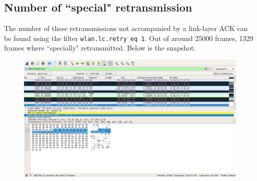 \documentclass{article}
\begin{document}
\subsection{Number of ``special" retransmission}
\begin{flushleft}
The number of these retransmissions not accompanied by a link-layer ACK can be found using the filter \texttt{wlan.lc.retry eq 1}. Out of around 25000 frames, 1329 frames where ``specially" retransmitted. Below is the snapshot:
\begin{figure}[H]
\centering
\includegraphics[width=0.85\linewidth]{snapshot-retrans.png}
\end{figure}
\end{flushleft}
\end{document}
